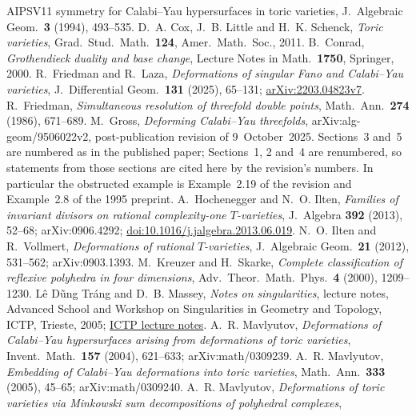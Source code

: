 \documentclass[11pt]{amsart}
\theoremstyle{definition}
\theoremstyle{remark}
\theoremstyle{plain}
\begin{document}
\begin{thebibliography}{AIPSV11}
{symmetry for Calabi--Yau hypersurfaces in toric varieties}, J.\ Algebraic Geom.\
\textbf{3} (1994), 493--535.
 D.~A. Cox, J.~B. Little and H.~K. Schenck,
\emph{Toric varieties}, Grad.\ Stud.\ Math.\ \textbf{124}, Amer.\ Math.\ Soc.,
2011.
 B.~Conrad, \emph{Grothendieck duality and base
change}, Lecture Notes in Math.\ \textbf{1750}, Springer, 2000.
 R.~Friedman and R.~Laza, \emph{Deformations of singular
Fano and Calabi--Yau varieties}, J.\ Differential Geom.\ \textbf{131} (2025),
65--131;
\href{https://arxiv.org/abs/2203.04823v7}{arXiv:2203.04823v7}.
 R.~Friedman, \emph{Simultaneous resolution of
threefold double points}, Math.\ Ann.\ \textbf{274} (1986), 671--689.
\bibitem[Gro97r]{Gross97rev} M.~Gross, \emph{Deforming Calabi--Yau
threefolds}, arXiv:alg-geom/9506022v2, post-publication revision of
9~October~2025.  Sections~3 and~5 are numbered as in the published paper;
Sections~1, 2 and~4 are renumbered, so statements from those sections are cited
here by the revision's numbers.  In particular the obstructed example is
Example~2.19 of the revision and Example~2.8 of the 1995 preprint.
\bibitem[HI13]{HI11} A.~Hochenegger and N.~O. Ilten, \emph{Families of
invariant divisors on rational complexity-one $T$-varieties}, J.\ Algebra
\textbf{392} (2013), 52--68; arXiv:0906.4292;
\href{https://doi.org/10.1016/j.jalgebra.2013.06.019}{doi:10.1016/j.jalgebra.2013.06.019}.
\bibitem[IV12]{IV12} N.~O. Ilten and R.~Vollmert, \emph{Deformations of
rational $T$-varieties}, J.\ Algebraic Geom.\ \textbf{21} (2012), 531--562;
arXiv:0903.1393.
 M.~Kreuzer and H.~Skarke, \emph{Complete classification of
reflexive polyhedra in four dimensions}, Adv.\ Theor.\ Math.\ Phys.\ \textbf{4}
(2000), 1209--1230.
 L\^e D\~ung Tr\'ang and D.~B. Massey,
\emph{Notes on singularities}, lecture notes, Advanced School and Workshop
on Singularities in Geometry and Topology, ICTP, Trieste, 2005;
\href{https://indico.ictp.it/event/a04204/session/8/contribution/6/material/0/1.pdf}{ICTP lecture notes}.
\bibitem[Mav04]{Mav04} A.~R. Mavlyutov, \emph{Deformations of Calabi--Yau
hypersurfaces arising from deformations of toric varieties}, Invent.\ Math.\
\textbf{157} (2004), 621--633; arXiv:math/0309239.
\bibitem[Mav05]{Mav05} A.~R. Mavlyutov, \emph{Embedding of Calabi--Yau
deformations into toric varieties}, Math.\ Ann.\ \textbf{333} (2005), 45--65;
arXiv:math/0309240.
\bibitem[Mav09]{Mav09} A.~R. Mavlyutov, \emph{Deformations of toric
varieties via Minkowski sum decompositions of polyhedral complexes},

\end{thebibliography}
\end{document}
